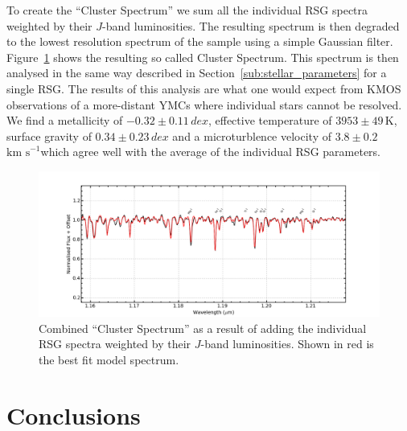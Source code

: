 \documentclass[useAMS,usenatbib]{mn2e}
\def\kms{$\mbox{km s}^{-1}$}
\begin{document}

To create the ``Cluster Spectrum'' we sum all the individual RSG spectra weighted by their $J$-band luminosities.
The resulting spectrum is then degraded to the lowest resolution spectrum of the sample using a simple Gaussian filter.
Figure~\ref{fig:clusterspec} shows the resulting so called Cluster Spectrum.
This spectrum is then analysed in the same way described in Section~\ref{sub:stellar_parameters} for a single RSG.
The results of this analysis are what one would expect from KMOS observations of a more-distant YMCs where individual stars cannot be resolved.
We find a metallicity of $-0.32\pm0.11\,dex$, effective temperature of $3953\pm49\,$K, surface gravity of $0.34\pm0.23\,dex$ and a microturblence velocity of $3.8\pm0.2\,$\kms which agree well with the average of the individual RSG parameters.

\begin{figure}
 \includegraphics[width=16.0cm]{NGC2100-clusterspec}
 \caption{Combined ``Cluster Spectrum'' as a result of adding the individual RSG spectra weighted by their $J$-band luminosities. Shown in red is the best fit model spectrum.
\label{fig:clusterspec}
          }
\end{figure}



\section{Conclusions} %
\label{sec:conclusions}
\end{document}
